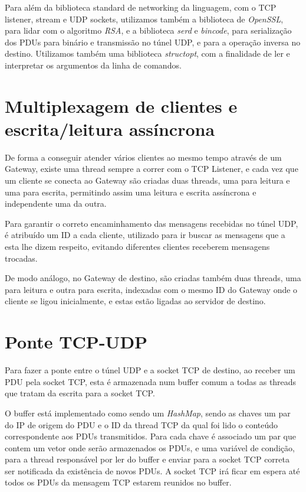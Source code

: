 \documentclass[a4paper]{report}
\begin{document}
Para além da biblioteca standard de networking da linguagem, com o TCP
listener, stream e UDP sockets, utilizamos também a biblioteca de 
\textit{OpenSSL}, para lidar com o algoritmo \textit{RSA}, e a biblioteca
\textit{serd} e \textit{bincode}, para serialização dos PDUs para binário
e transmissão no túnel UDP, e para a operação inversa no destino. Utilizamos
também uma biblioteca \textit{structopt}, com a finalidade de ler e interpretar 
os argumentos da linha de comandos.

\section{Multiplexagem de clientes e escrita/leitura assíncrona}

De forma a conseguir atender vários clientes ao mesmo tempo através de um
Gateway, existe uma thread sempre a correr com o TCP Listener, e cada vez que um
cliente se conecta ao Gateway são criadas duas threads, uma para leitura e uma
para escrita, permitindo assim uma leitura e escrita assíncrona e independente
uma da outra. 

Para garantir o correto encaminhamento das mensagens recebidas no 
túnel UDP, é atribuído um ID a cada cliente, utilizado para ir buscar
as mensagens que a esta lhe dizem respeito, evitando diferentes clientes
receberem mensagens trocadas.

De modo análogo, no Gateway de destino, são criadas também duas threads,
uma para leitura e outra para escrita, indexadas com o mesmo ID do Gateway 
onde o cliente se ligou inicialmente, e estas estão ligadas ao servidor 
de destino.

\section{Ponte TCP-UDP} \label{sec:tcp}

Para fazer a ponte entre o túnel UDP e a socket TCP de destino, ao receber
um PDU pela socket TCP, esta é armazenada num buffer comum a todas as threads
que tratam da escrita para a socket TCP.

O buffer está implementado como sendo um \textit{HashMap}, sendo as chaves um 
par do IP de origem do PDU e o ID da thread TCP da qual foi lido o conteúdo 
correspondente aos PDUs transmitidos. Para cada chave é associado um par que
contem um vetor onde serão armazenados os PDUs, e uma variável de condição,
para a thread responsável por ler do buffer e enviar para a socket TCP correta
ser notificada da existência de novos PDUs. A socket TCP irá ficar em espera
até todos os PDUs da mensagem TCP estarem reunidos no buffer.
\end{document}
